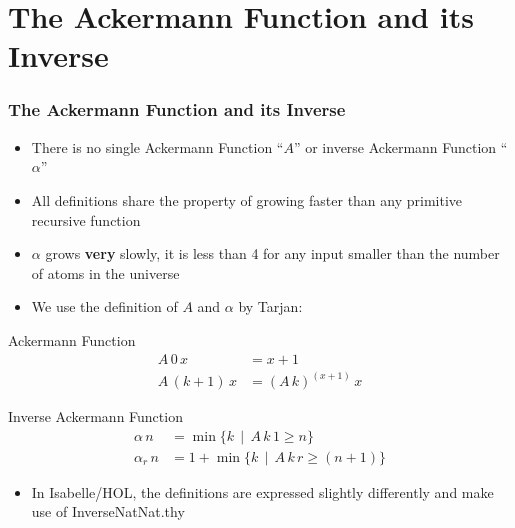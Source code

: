 \section{The Ackermann Function and its Inverse}
\begin{frame}
	\frametitle{The Ackermann Function and its Inverse}
	\begin{itemize}
		\item There is no single Ackermann Function ``$A$'' or inverse Ackermann Function ``$\alpha$''
		\item All definitions share the property of growing faster than any primitive recursive function
		\item $\alpha$ grows \textbf{very} slowly, it is less than 4 for any input smaller than the number of atoms in the universe
		\item We use the definition of $A$ and $\alpha$ by Tarjan:
	\end{itemize}
\begin{minipage}{0.45\linewidth}
\begin{dfn} Ackermann Function
	\begin{align*}
	A \, 0 \, x &= x + 1  \\
	A \, (k + 1)\, x &= (A\, k)^{(x + 1)}\, x 
	\end{align*}
\end{dfn}
\end{minipage}
\begin{minipage}{0.45\linewidth}
\begin{dfn} Inverse Ackermann Function
	\begin{align*}
	\alpha \, n &= \min \{ k \,\mid\, A\, k\, 1 \geq n \}\\
	\alpha_r \, n &= 1 + \min\{ k \,\mid\, A\, k\, r \geq (n + 1) \}
	\end{align*}
\end{dfn}
\end{minipage}

\begin{itemize}
	\item In Isabelle/HOL, the definitions are expressed slightly differently and make use of InverseNatNat.thy
\end{itemize}
\end{frame}

